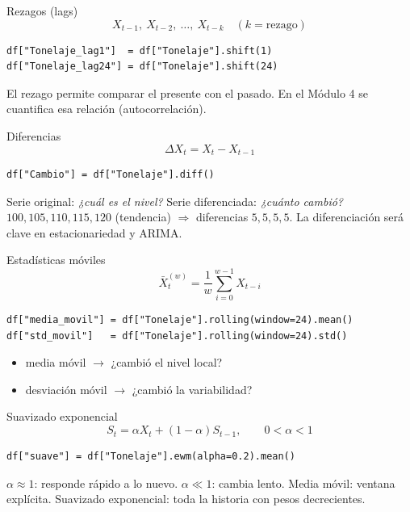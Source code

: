 \begin{frame}[fragile]{Rezagos (lags)}
\[
X_{t-1},\ X_{t-2},\ \dots,\ X_{t-k}\quad (k=\text{rezago})
\]
\begin{lstlisting}
df["Tonelaje_lag1"]  = df["Tonelaje"].shift(1)
df["Tonelaje_lag24"] = df["Tonelaje"].shift(24)
\end{lstlisting}
El rezago permite comparar el presente con el pasado. En el Módulo 4 se cuantifica
esa relación (autocorrelación).
\end{frame}

\begin{frame}[fragile]{Diferencias}
\[
\Delta X_t = X_t - X_{t-1}
\]
\begin{lstlisting}
df["Cambio"] = df["Tonelaje"].diff()
\end{lstlisting}
Serie original: \emph{¿cuál es el nivel?} \qquad Serie diferenciada: \emph{¿cuánto cambió?}
\vfill
$100,105,110,115,120$ (tendencia) $\Rightarrow$ diferencias $5,5,5,5$. La diferenciación será
clave en estacionariedad y ARIMA.
\end{frame}

\begin{frame}[fragile]{Estadísticas móviles}
\[
\bar X_t^{(w)}=\frac{1}{w}\sum_{i=0}^{w-1}X_{t-i}
\]
\begin{lstlisting}
df["media_movil"] = df["Tonelaje"].rolling(window=24).mean()
df["std_movil"]   = df["Tonelaje"].rolling(window=24).std()
\end{lstlisting}
\begin{itemize}
  \item media móvil $\rightarrow$ ¿cambió el nivel local?
  \item desviación móvil $\rightarrow$ ¿cambió la variabilidad?
\end{itemize}
\end{frame}

\begin{frame}[fragile]{Suavizado exponencial}
\[
S_t=\alpha X_t+(1-\alpha)S_{t-1},\qquad 0<\alpha<1
\]
\begin{lstlisting}
df["suave"] = df["Tonelaje"].ewm(alpha=0.2).mean()
\end{lstlisting}
$\alpha\approx1$: responde rápido a lo nuevo. $\alpha\ll1$: cambia lento.
Media móvil: ventana explícita. Suavizado exponencial: toda la historia con pesos decrecientes.
\end{frame}

